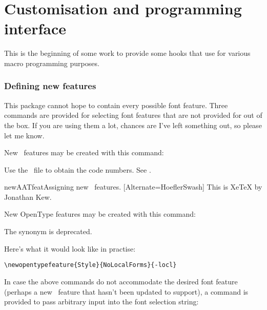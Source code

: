 \documentclass[a4paper]{l3doc}
\begin{document}
\part{Customisation and programming interface}

This is the beginning of some work to provide some hooks that use
 for various macro programming purposes.


\section{Defining new features} \label{sec:newfeatures}
This package cannot hope to contain every possible font
feature. Three commands are provided for selecting font features
that are not provided for out of the box. If you are using
them a lot, chances are I've left something out, so please let me
know.

\DescribeMacro{\newAATfeature}
New \AAT\ features may be created with this command:\par
{\centering\cmd\newAATfeature{}\par}\noindent
Use the \XeTeX\ file  to obtain the code numbers.
See .

\begin{Xexample}{newAATfeat}{Assigning new \AAT\ features.}
  [Alternate=HoeflerSwash]
   This is XeTeX by Jonathan Kew.
\end{Xexample}


\DescribeMacro{\newopentypefeature}
New OpenType features may be created with this command:\par
{\centering\cmd\newopentypefeature{}\par}
The synonym  is deprecated.

Here's what it would look like in practise:
\begin{Verbatim}
\newopentypefeature{Style}{NoLocalForms}{-locl}
\end{Verbatim}

\DescribeMacro{\newfontfeature}
In case the above commands do not accommodate the desired font feature
(perhaps a new \XeTeX\ feature that  hasn't been updated
to support), a command is provided to pass arbitrary input into the
font selection string:\par
{\centering\cmd{\newfontfeature}\par}
\end{document}
